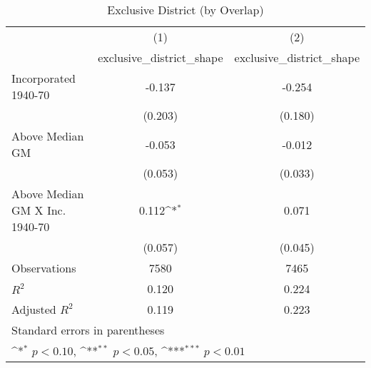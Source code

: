 \begin{table}[htbp]\centering
\def\sym#1{\ifmmode^{#1}\else\(^{#1}\)\fi}
\caption{Exclusive District (by Overlap)}
\begin{tabular}{l*{2}{c}}
\hline\hline
                    &\multicolumn{1}{c}{(1)}&\multicolumn{1}{c}{(2)}\\
                    &\multicolumn{1}{c}{exclusive\_district\_shape}&\multicolumn{1}{c}{exclusive\_district\_shape}\\
\hline
Incorporated 1940-70&      -0.137         &      -0.254         \\
                    &     (0.203)         &     (0.180)         \\
[1em]
Above Median GM     &      -0.053         &      -0.012         \\
                    &     (0.053)         &     (0.033)         \\
[1em]
Above Median GM X Inc. 1940-70&       0.112\sym{*}  &       0.071         \\
                    &     (0.057)         &     (0.045)         \\
\hline
Observations        &        7580         &        7465         \\
\(R^{2}\)           &       0.120         &       0.224         \\
Adjusted \(R^{2}\)  &       0.119         &       0.223         \\
\hline\hline
\multicolumn{3}{l}{\footnotesize Standard errors in parentheses}\\
\multicolumn{3}{l}{\footnotesize \sym{*} \(p<0.10\), \sym{**} \(p<0.05\), \sym{***} \(p<0.01\)}\\
\end{tabular}
\end{table}
